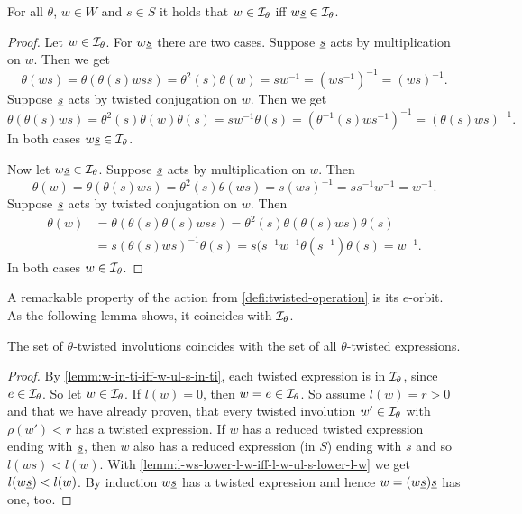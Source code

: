 \begin{lemm}
	For all $\theta$, $w \in W$ and $s \in S$ it holds that $w \in \mathcal{I}_{\theta}$ iff $w \underline{s} \in \mathcal{I}_{\theta}$.

	\begin{proof}
		Let $w \in \mathcal{I}_{\theta}$. For $w \underline{s}$ there are two cases. Suppose $\underline{s}$ acts by multiplication on $w$. Then we get
		$$ \theta(ws) = \theta(\theta(s)wss) = \theta^2(s) \theta(w) = sw^{-1} = (ws^{-1})^{-1} = (ws)^{-1}. $$
		Suppose $\underline{s}$ acts by twisted conjugation on $w$. Then we get
		$$ \theta(\theta(s)ws) = \theta^2(s) \theta(w) \theta(s) = sw^{-1}\theta(s) = (\theta^{-1}(s)ws^{-1})^{-1} = (\theta(s)ws)^{-1}. $$
		In both cases $w \underline{s} \in \mathcal{I}_{\theta}$.

		Now let $w \underline{s} \in \mathcal{I}_{\theta}$. Suppose $\underline{s}$ acts by multiplication on $w$. Then
		$$ \theta(w) = \theta(\theta(s)ws) = \theta^2(s)\theta(ws) = s (ws)^{-1} = ss^{-1}w^{-1} = w^{-1}. $$
		Suppose $\underline{s}$ acts by twisted conjugation on $w$. Then
		\begin{align*}
			\theta(w)	& = \theta(\theta(s)\theta(s)wss) = \theta^2(s) \theta(\theta(s)ws) \theta(s) \\
						& = s (\theta(s)ws)^{-1} \theta(s) = s(s^{-1} w^{-1} \theta(s^{-1}) \theta(s) = w^{-1}.
		\end{align*}
		In both cases $w \in \mathcal{I}_{\theta}$.
	\end{proof}
\end{lemm}

A remarkable property of the action from \ref{defi:twisted-operation} is its $e$-orbit. As the following lemma shows, it coincides with $\mathcal{I}_{\theta}$.

\begin{lemm}
	The set of $\theta$-twisted involutions coincides with the set of all $\theta$-twisted expressions.

	\begin{proof}
		By \ref{lemm:w-in-ti-iff-w-ul-s-in-ti}, each twisted expression is in $\mathcal{I}_{\theta}$, since $e \in \mathcal{I}_{\theta}$. So let $w \in \mathcal{I}_{\theta}$. If $l(w) = 0$, then $w = e \in \mathcal{I}_{\theta}$. So assume $l(w) = r > 0$ and that we have already proven, that every twisted involution $w' \in \mathcal{I}_{\theta}$ with $\rho(w') < r$ has a twisted expression. If $w$ has a reduced twisted expression ending with $\underline{s}$, then $w$ also has a reduced expression (in $S$) ending with $s$ and so $l(ws) < l(w)$. With \ref{lemm:l-ws-lower-l-w-iff-l-w-ul-s-lower-l-w} we get $l(w \underline{s}) < l(w)$. By induction $w \underline{s}$ has a twisted expression and hence $w = (w \underline{s}) \underline{s}$ has one, too.
	\end{proof} 
\end{lemm}

